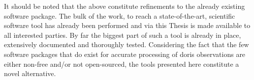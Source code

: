 It should be noted that the above constitute refinements to the already existing 
software package. The bulk of the work, to reach a state-of-the-art, scientific 
software tool has already been performed and via this Thesis is made available to all 
interested parties. By far the biggest part of such a tool is already in place, 
extensively documented and thoroughly tested. Considering the fact that the few 
software packages that do exist for accurate processing of \gls{doris} observations 
are either non-free and/or not open-sourced, the tools presented here constitute a 
novel alternative.

\iffalse
\gls{pod} analysis is a very challenging task, requiring multi-scientific expertise, 
coupled with efficient engineering. Given the accuracy requirements today (especially 
for altimetry missions on-board which \gls{doris} receivers are installed), the 
ever growing number of scientific satellites missions, and the widening of the application 
range (e.g. climate change studies), it constitutes a field of growing dynamics.
\fi
